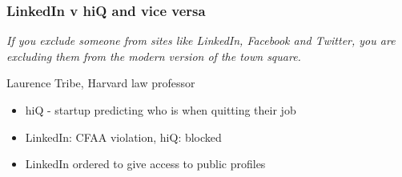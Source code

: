 \begin{frame}
    \frametitle{LinkedIn v hiQ and vice versa}
{
\center
\textit{
\large
If you exclude someone from sites like LinkedIn, Facebook and Twitter, you are excluding them from the modern version of the town square. }
} \\
\vspace{-10pt}
\begin{flushright}
Laurence Tribe, Harvard law professor
\end{flushright}
\vspace{10pt}
\begin{itemize}
    \item hiQ - startup predicting who is when quitting their job
    \item LinkedIn: CFAA violation, hiQ: blocked
    \item LinkedIn ordered to give access to public profiles
\end{itemize}
\end{frame}


